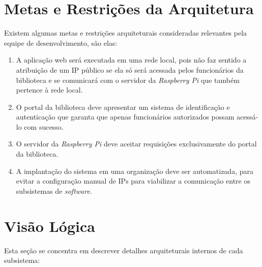 \section{Metas e Restrições da Arquitetura}
Existem algumas metas e restrições arquiteturais consideradas relevantes pela equipe de desenvolvimento, são elas:

\begin{enumerate}
    \item A aplicação web será executada em uma rede local, pois não faz sentido a atribuição de um IP público se ela só será acessada pelos funcionários da biblioteca e se comunicará com o servidor da \textit{Raspberry Pi} que também pertence à rede local.

    \item O portal da biblioteca deve apresentar um sistema de identificação e autenticação que garanta que apenas funcionários autorizados possam acessá-lo com sucesso.

    \item O servidor da \textit{Raspberry Pi} deve aceitar requisições exclusivamente do portal da biblioteca.

    \item A implantação do sistema em uma organização deve ser automatizada, para evitar a configuração manual de IPs para viabilizar a comunicação entre os subsistemas de \textit{software}.
\end{enumerate}

\section{Visão Lógica}
Esta seção se concentra em descrever detalhes arquiteturais internos de cada subsistema:

